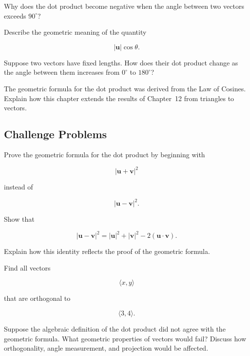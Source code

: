 \begin{exercise}
Why does the dot product become negative when the angle between two
vectors exceeds $90^\circ$?
\end{exercise}

\begin{exercise}
Describe the geometric meaning of the quantity

\[
|\mathbf{u}|\cos\theta.
\]
\end{exercise}

\begin{exercise}
Suppose two vectors have fixed lengths. How does their dot product change
as the angle between them increases from $0^\circ$ to $180^\circ$?
\end{exercise}

\begin{exercise}
The geometric formula for the dot product was derived from the Law of
Cosines. Explain how this chapter extends the results of Chapter~12 from
triangles to vectors.
\end{exercise}

\subsection*{Challenge Problems}

\begin{exercise}
Prove the geometric formula for the dot product by beginning with

\[
|\mathbf{u}+\mathbf{v}|^2
\]

instead of

\[
|\mathbf{u}-\mathbf{v}|^2.
\]
\end{exercise}

\begin{exercise}
Show that

\[
|\mathbf{u}-\mathbf{v}|^2
=
|\mathbf{u}|^2
+
|\mathbf{v}|^2
-
2(\mathbf{u}\cdot\mathbf{v}).
\]

Explain how this identity reflects the proof of the geometric formula.
\end{exercise}

\begin{exercise}
Find all vectors

\[
\langle x,y\rangle
\]

that are orthogonal to

\[
\langle 3,4\rangle.
\]
\end{exercise}

\begin{exercise}
Suppose the algebraic definition of the dot product did not agree with
the geometric formula. What geometric properties of vectors would fail?
Discuss how orthogonality, angle measurement, and projection would be
affected.
\end{exercise}
